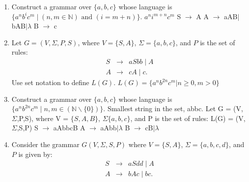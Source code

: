 \documentclass{article}
\newcommand{\nat}{\mathbb{N}}
\begin{document}
\begin{enumerate}
\item Construct a grammar over $\{a, b, c\}$ whose language is
  $\{a^nb^ic^m \mid (n, m \in \nat) \mbox{ and } (i = m+n)\}$.
  \newline $a^ni^{m+n}c^m$
  \newline S $\rightarrow$ A
  \newline A $\rightarrow$ aAB$|$bAB$|\lambda$
  \newline B $\rightarrow$ c
  
  \item Let $G = (V, \Sigma, P, S)$, where $V = \{S, A\}$, $\Sigma =
  \{a, b, c\}$, and $P$ is the set of rules:
\begin{eqnarray*}
S &\rightarrow& aSbb \mid A\\
A &\rightarrow& cA \mid c.
\end{eqnarray*}
Use set notation to define $L(G)$.
\newline $L(G) = \{a^nb^{2n}c^m|n\geq0,m>0\}$

\item Construct a grammar over $\{a, b, c\}$ whose language is
  $\{a^nb^{2n}c^m \mid n, m \in (\nat \backslash \{0\})\}$.
  \newline Smallest string in the set, abbc. Let G = (V, $\Sigma$,P,S), where V = $\{S,A,B\}$, $\Sigma \{a,b,c\}$, and P is the set of rules:
  \newline L(G) = (V,$\Sigma$,S,P)
  \newline S $\rightarrow$ aAbbcB
  \newline A $\rightarrow$ aAbb$|\lambda$
  \newline B $\rightarrow$ cB$|\lambda$
\item Consider the grammar $G(V, \Sigma, S, P)$ where $V = \{S, A\}$,
  $\Sigma = \{a, b, c, d\}$, and $P$ is given by:
  \begin{eqnarray*}
    S &\rightarrow& aSdd \mid A\\
    A &\rightarrow& bAc \mid bc.
  \end{eqnarray*}


\end{enumerate}
\end{document}

